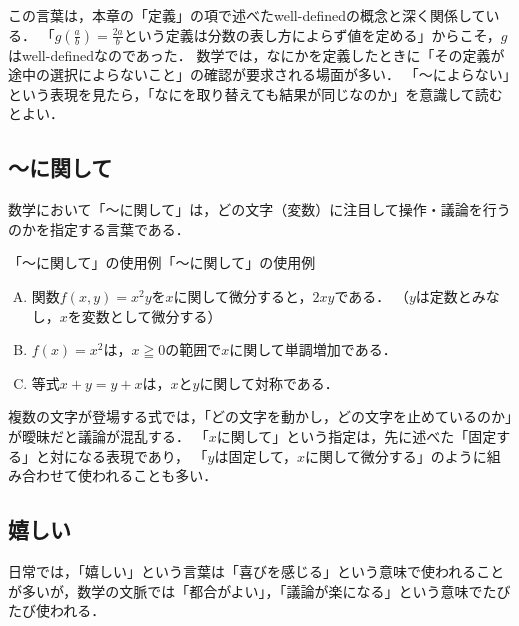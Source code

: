 この言葉は，本章の「定義」の項で述べたwell-definedの概念と深く関係している．
「$g\left(\frac{a}{b}\right)=\frac{2a}{b}$という定義は分数の表し方によらず値を定める」からこそ，$g$はwell-definedなのであった．
数学では，なにかを定義したときに「その定義が途中の選択によらないこと」の確認が要求される場面が多い．
「〜によらない」という表現を見たら，「なにを取り替えても結果が同じなのか」を意識して読むとよい．


\subsection{〜に関して}

数学において「〜に関して」は，どの文字（変数）に注目して操作・議論を行うのかを指定する言葉である．
\begin{example}{「〜に関して」の使用例}{「〜に関して」の使用例}
  \begin{enumerate}[(A)]
    \item 関数$f(x,y)=x^2 y$を$x$に関して微分すると，$2xy$である．
    （$y$は定数とみなし，$x$を変数として微分する）
    \item $f(x)=x^2$は，$x \geqq 0$の範囲で$x$に関して単調増加である．
    \item 等式$x+y=y+x$は，$x$と$y$に関して対称である．
  \end{enumerate}
\end{example}

複数の文字が登場する式では，「どの文字を動かし，どの文字を止めているのか」が曖昧だと議論が混乱する．
「$x$に関して」という指定は，先に述べた「固定する」と対になる表現であり，
「$y$は固定して，$x$に関して微分する」のように組み合わせて使われることも多い．

\subsection{嬉しい}

日常では，「嬉しい」という言葉は「喜びを感じる」という意味で使われることが多いが，数学の文脈では「都合がよい」，「議論が楽になる」という意味でたびたび使われる．

